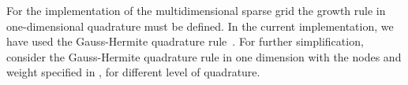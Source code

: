 \documentclass[letter,1p,11pt,oneside,onecolumn,sort&compress]{elsarticle}
\begin{document}
For the implementation of the multidimensional sparse grid the growth rule in one-dimensional quadrature must be defined. In the current implementation, we have used the Gauss-Hermite quadrature rule~\cite{eldred2009recent,smith2013uncertainty}.
For further simplification, consider the Gauss-Hermite quadrature rule in one dimension with the nodes and weight specified in , for different level of quadrature.
\end{document}
